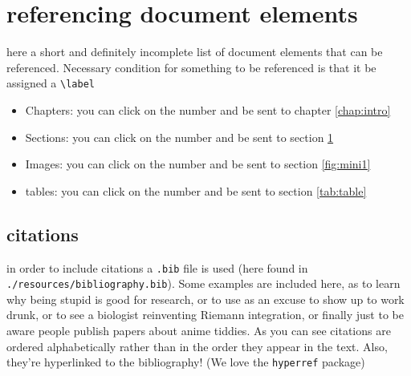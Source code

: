 \documentclass[../thesis.tex]{subfiles}
\begin{document}
\section{referencing document elements} \label{sec:ref}
here a short and definitely incomplete list of document elements that can be referenced. Necessary condition for something to be referenced is that it be assigned a \verb|\label|
\begin{itemize}
    \item Chapters: you can click on the number and be sent to chapter \ref{chap:intro}  
    \item Sections: you can click on the number and be sent to section \ref{sec:ref}
    \item Images: you can click on the number and be sent to section \ref{fig:mini1}
    \item tables: you can click on the number and be sent to section \ref{tab:table}
\end{itemize}
\subsection{citations}
in order to include citations a \verb|.bib| file is used (here found in \verb|./resources/bibliography.bib|). Some examples are included here, as \cite{dumb} to learn why being stupid is good for research, or \cite{drinking} to use as an excuse to show up to work drunk, or \cite{integration} to see a biologist reinventing Riemann integration, or finally \cite{booba} just to be aware people publish papers about anime tiddies. As you can see citations are ordered alphabetically rather than in the order they appear in the text. Also, they're hyperlinked to the bibliography! (We love the \verb|hyperref| package)
\end{document}
